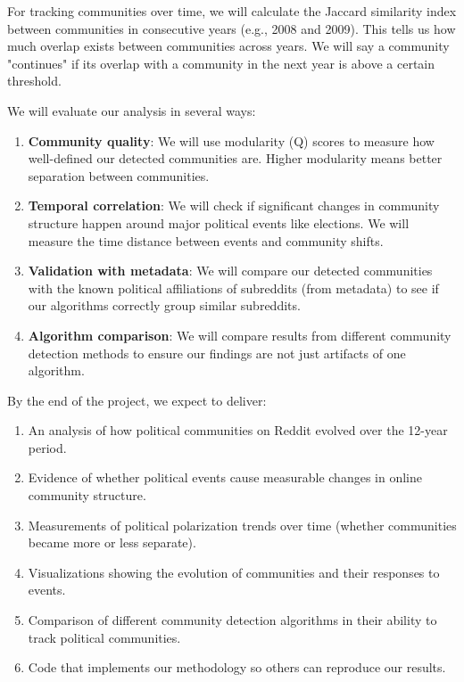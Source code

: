\documentclass[11pt]{article}
\newcommand{\propitem}[1]{\noindent{\textbf{\color{kthblue}#1:} }}
\begin{document}
For tracking communities over time, we will calculate the Jaccard similarity index between communities in consecutive years (e.g., 2008 and 2009). This tells us how much overlap exists between communities across years. We will say a community "continues" if its overlap with a community in the next year is above a certain threshold.

\propitem{Evaluation} We will evaluate our analysis in several ways:

\begin{enumerate}
    \item \textbf{Community quality}: We will use modularity (Q) scores to measure how well-defined our detected communities are. Higher modularity means better separation between communities.
    
    \item \textbf{Temporal correlation}: We will check if significant changes in community structure happen around major political events like elections. We will measure the time distance between events and community shifts.
    
    \item \textbf{Validation with metadata}: We will compare our detected communities with the known political affiliations of subreddits (from metadata) to see if our algorithms correctly group similar subreddits.
    
    \item \textbf{Algorithm comparison}: We will compare results from different community detection methods to ensure our findings are not just artifacts of one algorithm.
\end{enumerate}

\propitem{Expected Outcomes} By the end of the project, we expect to deliver:

\begin{enumerate}
    \item An analysis of how political communities on Reddit evolved over the 12-year period.
    \item Evidence of whether political events cause measurable changes in online community structure.
    \item Measurements of political polarization trends over time (whether communities became more or less separate).
    \item Visualizations showing the evolution of communities and their responses to events.
    \item Comparison of different community detection algorithms in their ability to track political communities.
    \item Code that implements our methodology so others can reproduce our results.
\end{enumerate}
\end{document}

